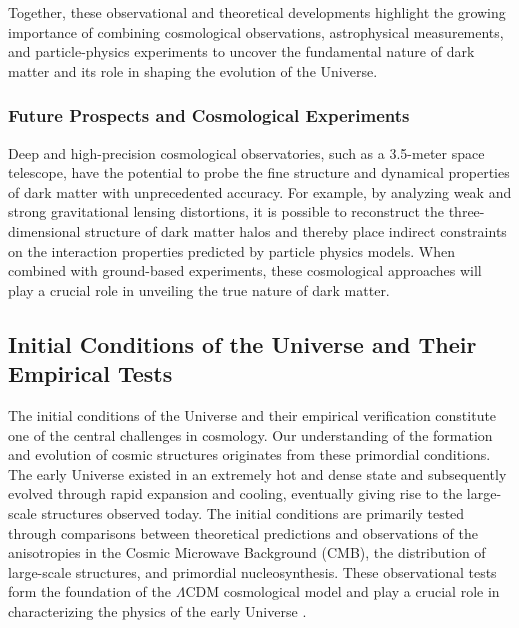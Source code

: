 Together, these observational and theoretical developments highlight the growing importance of combining cosmological observations, astrophysical measurements, and particle-physics experiments to uncover the fundamental nature of dark matter and its role in shaping the evolution of the Universe.

\subsubsection{Future Prospects and Cosmological Experiments}

Deep and high-precision cosmological observatories, such as a 3.5-meter space telescope, have the potential to probe the fine structure and dynamical properties of dark matter with unprecedented accuracy. For example, by analyzing weak and strong gravitational lensing distortions, it is possible to reconstruct the three-dimensional structure of dark matter halos and thereby place indirect constraints on the interaction properties predicted by particle physics models. When combined with ground-based experiments, these cosmological approaches will play a crucial role in unveiling the true nature of dark matter.

\subsection{Initial Conditions of the Universe and Their Empirical Tests}\label{initial-conditions-of-the-universe-and-their-empirical-tests}

The initial conditions of the Universe and their empirical verification constitute one of the central challenges in cosmology. Our understanding of the formation and evolution of cosmic structures originates from these primordial conditions. The early Universe existed in an extremely hot and dense state and subsequently evolved through rapid expansion and cooling, eventually giving rise to the large-scale structures observed today. The initial conditions are primarily tested through comparisons between theoretical predictions and observations of the anisotropies in the Cosmic Microwave Background (CMB), the distribution of large-scale structures, and primordial nucleosynthesis. These observational tests form the foundation of the $\Lambda$CDM cosmological model and play a crucial role in characterizing the physics of the early Universe \cite{akrami2020}.

